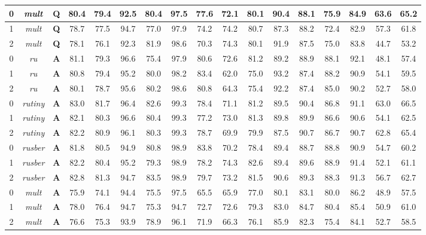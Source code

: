 \begin{table}[t]
{\begin{tabular}{|c|c||c|c|c|c|c|c|c|c|c|c|c|c|c|c|c|}
0 & \textit{mult} &  \textbf{Q} & 80.4 & 79.4 & 92.5 & 80.4 & 97.5 & 77.6 & 72.1 & 80.1 & 90.4 & 88.1 & 75.9 & 84.9 & 63.6 & 65.2\\ \hline
1 & \textit{mult} &  \textbf{Q} & 78.7 & 77.5 & 94.7 & 77.0 & 97.9 & 74.2 & 74.2 & 80.7 & 87.3 & 88.2 & 72.4 & 82.9 & 57.3 & 61.8\\ \hline
2 & \textit{mult} &  \textbf{Q} & 78.1 & 76.1 & 92.3 & 81.9 & 98.6 & 70.3 & 74.3 & 80.1 & 91.9 & 87.5 & 75.0 & 83.8 & 44.7 & 53.2\\ \hline
0 & \textit{ru} &  \textbf{A} & 81.1 & 79.3 & 96.6 & 75.4 & 97.9 & 80.6 & 72.6 & 81.2 & 89.2 & 88.9 & 88.1 & 92.1 & 48.1 & 57.4\\ \hline
1 & \textit{ru} &  \textbf{A} & 80.8 & 79.4 & 95.2 & 80.0 & 98.2 & 83.4 & 62.0 & 75.0 & 93.2 & 87.4 & 88.2 & 90.9 & 54.1 & 59.5\\ \hline
2 & \textit{ru} &  \textbf{A} & 80.1 & 78.7 & 95.6 & 80.2 & 98.6 & 80.8 & 64.3 & 75.4 & 92.2 & 87.4 & 85.0 & 90.2 & 52.7 & 58.0\\ \hline
0 & \textit{rutiny} &  \textbf{A} & 83.0 & 81.7 & 96.4 & 82.6 & 99.3 & 78.4 & 71.1 & 81.2 & 89.5 & 90.4 & 86.8 & 91.1 & 63.0 & 66.5\\ \hline
1 & \textit{rutiny} &  \textbf{A} & 82.1 & 80.3 & 96.6 & 80.4 & 99.3 & 77.2 & 73.0 & 81.3 & 89.8 & 89.9 & 86.6 & 90.6 & 54.1 & 62.5\\ \hline
2 & \textit{rutiny} &  \textbf{A} & 82.2 & 80.9 & 96.1 & 80.3 & 99.3 & 78.7 & 69.9 & 79.9 & 87.5 & 90.7 & 86.7 & 90.7 & 62.8 & 65.4\\ \hline
0 & \textit{rusber} &  \textbf{A} & 81.8 & 80.5 & 94.9 & 80.8 & 98.9 & 83.8 & 70.2 & 78.4 & 89.4 & 88.7 & 88.8 & 90.9 & 54.7 & 60.2\\ \hline
1 & \textit{rusber} &  \textbf{A} & 82.2 & 80.4 & 95.2 & 79.3 & 98.9 & 78.2 & 74.3 & 82.6 & 89.4 & 89.6 & 88.9 & 91.4 & 52.1 & 61.1\\ \hline
2 & \textit{rusber} &  \textbf{A} & 82.8 & 81.3 & 94.7 & 83.5 & 98.9 & 79.7 & 73.2 & 81.5 & 90.6 & 89.3 & 88.3 & 91.3 & 56.7 & 62.7\\ \hline
0 & \textit{mult} &  \textbf{A} & 75.9 & 74.1 & 94.4 & 75.5 & 97.5 & 65.5 & 65.9 & 77.0 & 80.1 & 83.1 & 80.0 & 86.2 & 48.9 & 57.5\\ \hline
1 & \textit{mult} &  \textbf{A} & 78.0 & 76.4 & 94.7 & 75.3 & 94.7 & 72.7 & 72.6 & 79.3 & 83.0 & 84.7 & 80.4 & 85.4 & 50.9 & 61.0\\ \hline
2 & \textit{mult} &  \textbf{A} & 76.6 & 75.3 & 93.9 & 78.9 & 96.1 & 71.9 & 66.3 & 76.1 & 85.9 & 82.3 & 75.4 & 84.1 & 52.7 & 58.5\\ \hline

\end{tabular}}
\end{table}
